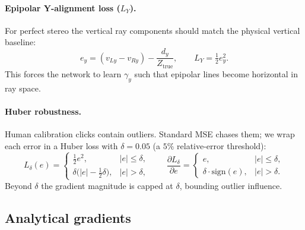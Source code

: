 \documentclass[11pt]{article}
\begin{document}
\paragraph{Epipolar Y-alignment loss ($L_Y$).} For perfect stereo the vertical ray
components should match the physical vertical baseline:
\begin{equation}
e_y = (v_{Ly} - v_{Ry}) - \frac{d_y}{Z_\text{true}}, \qquad L_Y = \tfrac{1}{2} e_y^2.
\label{eq:ly}
\end{equation}
This forces the network to learn $\gamma_y$ such that epipolar lines become horizontal in
ray space.

\paragraph{Huber robustness.} Human calibration clicks contain outliers. Standard MSE
chases them; we wrap each error in a Huber loss with $\delta = 0.05$ (a $5\%$
relative-error threshold):
\begin{equation}
L_\delta(e) =
\begin{cases}
\tfrac{1}{2} e^2,                       & |e| \leq \delta,\\
\delta \big(|e| - \tfrac{1}{2}\delta\big), & |e| > \delta,
\end{cases}
\qquad
\frac{\partial L_\delta}{\partial e} =
\begin{cases}
e,                  & |e| \leq \delta,\\
\delta \cdot \text{sign}(e), & |e| > \delta.
\end{cases}
\label{eq:huber}
\end{equation}
Beyond $\delta$ the gradient magnitude is capped at $\delta$, bounding outlier influence.

\subsection{Analytical gradients}
\end{document}
